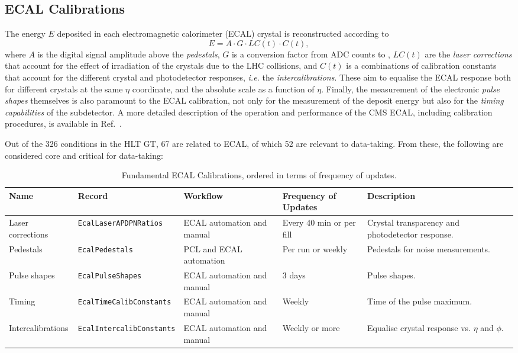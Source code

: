 \subsection{ECAL Calibrations}\label{sec:ECALlaser}

The energy $E$ deposited in each electromagnetic calorimeter (ECAL) crystal is reconstructed according to 
\[
E = A \cdot G \cdot LC(t) \cdot C(t),
\]
where
$A$ is the digital signal amplitude above the \emph{pedestals},
$G$ is a conversion factor from ADC counts to \GeV,
$LC(t)$ are the \emph{laser corrections} that account for the effect of irradiation of the crystals due to the LHC collisions, and
$C(t)$ is a combinations of calibration constants that account for the different crystal and photodetector responses, \textit{i.e.} the \emph{intercalibrations}.
These aim to equalise the ECAL response both for different crystals at the same $\eta$ coordinate,
and
the absolute scale as a function of $\eta$.
Finally, the measurement of the electronic \emph{pulse shapes} themselves is also paramount to the ECAL calibration, not only for the measurement of the deposit energy but also for the \emph{timing capabilities} of the subdetector.
A more detailed description of
the operation and performance of the CMS ECAL,
including calibration procedures,
is available in Ref.~\cite{CMS:2024ppo}.

Out of the 326 conditions in the HLT GT,
67 are related to ECAL, %
of which 52 are relevant to \Runthree data-taking. %
From these, the following are considered core and critical for data-taking:
\begin{table}[h!]
    \centering
    \begin{adjustbox}{max width=\textwidth}
    \begin{tabular}{p{3.5cm}|p{4.5cm}|p{2.5cm}|p{2cm}|p{4cm}}
        \textbf{Name} & \textbf{Record} & \textbf{Workflow} & \textbf{Frequency of Updates} & \textbf{Description} \\ \hline
    Laser corrections & \texttt{EcalLaserAPDPNRatios} & ECAL automation and manual & Every 40 min or per fill & Crystal transparency and photodetector response. \\
    Pedestals & \texttt{EcalPedestals} & PCL and ECAL automation & Per run or weekly & Pedestals for noise measurements. \\
    Pulse shapes & \texttt{EcalPulseShapes} & ECAL automation and manual & 3 days & Pulse shapes. \\
    Timing & \texttt{EcalTimeCalibConstants} & ECAL automation and manual & Weekly & Time of the pulse maximum.\\
    Intercalibrations & \texttt{EcalIntercalibConstants} & ECAL automation and manual & Weekly or more & Equalise crystal response vs. $\eta$ and $\phi$.
    \end{tabular}
    \end{adjustbox}
    \caption{Fundamental ECAL Calibrations, ordered in terms of frequency of updates.}
    \label{tab:ECALCalibrations_critical}
\end{table}

